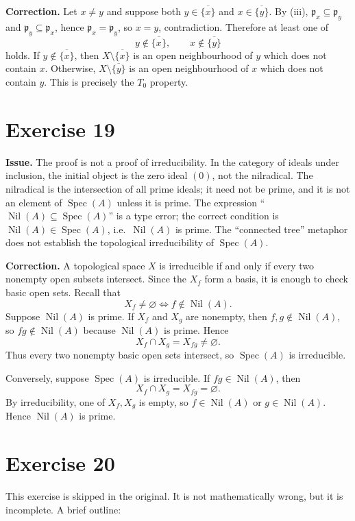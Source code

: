 \documentclass[11pt]{article}
\DeclareMathOperator{\Spec}{Spec}
\DeclareMathOperator{\Nil}{Nil}
\newcommand{\fp}{\mathfrak p}
\begin{document}
\textbf{Correction.}  Let \(x\neq y\) and suppose both
\(y\in\overline{\{x\}}\) and \(x\in\overline{\{y\}}\).  By (iii),
\(\fp_x\subseteq\fp_y\) and \(\fp_y\subseteq\fp_x\), hence
\(\fp_x=\fp_y\), so \(x=y\), contradiction.  Therefore at least one of
\[
y\notin\overline{\{x\}},\qquad x\notin\overline{\{y\}}
\]
holds.  If \(y\notin\overline{\{x\}}\), then
\(X\setminus\overline{\{x\}}\) is an open neighbourhood of \(y\) which does
not contain \(x\).  Otherwise, \(X\setminus\overline{\{y\}}\) is an open
neighbourhood of \(x\) which does not contain \(y\).  This is precisely the
\(T_0\) property.

\section*{Exercise 19}

\textbf{Issue.}  The proof is not a proof of irreducibility.  In the category
of ideals under inclusion, the initial object is the zero ideal \((0)\), not
the nilradical.  The nilradical is the intersection of all prime ideals; it
need not be prime, and it is not an element of \(\Spec(A)\) unless it is
prime.  The expression ``\(\Nil(A)\subseteq\Spec(A)\)'' is a type error; the
correct condition is \(\Nil(A)\in\Spec(A)\), i.e.\ \(\Nil(A)\) is prime.
The ``connected tree'' metaphor does not establish the topological
irreducibility of \(\Spec(A)\).

\textbf{Correction.}  A topological space \(X\) is irreducible if and only if
every two nonempty open subsets intersect.  Since the \(X_f\) form a basis,
it is enough to check basic open sets.  Recall that
\[
X_f\neq\varnothing\iff f\notin\Nil(A).
\]
Suppose \(\Nil(A)\) is prime.  If \(X_f\) and \(X_g\) are nonempty, then
\(f,g\notin\Nil(A)\), so \(fg\notin\Nil(A)\) because \(\Nil(A)\) is prime.
Hence
\[
X_f\cap X_g=X_{fg}\neq\varnothing.
\]
Thus every two nonempty basic open sets intersect, so \(\Spec(A)\) is
irreducible.

Conversely, suppose \(\Spec(A)\) is irreducible.  If \(fg\in\Nil(A)\), then
\[
X_f\cap X_g=X_{fg}=\varnothing.
\]
By irreducibility, one of \(X_f,X_g\) is empty, so \(f\in\Nil(A)\) or
\(g\in\Nil(A)\).  Hence \(\Nil(A)\) is prime.

\section*{Exercise 20}

This exercise is skipped in the original.  It is not mathematically wrong, but
it is incomplete.  A brief outline:
\end{document}

